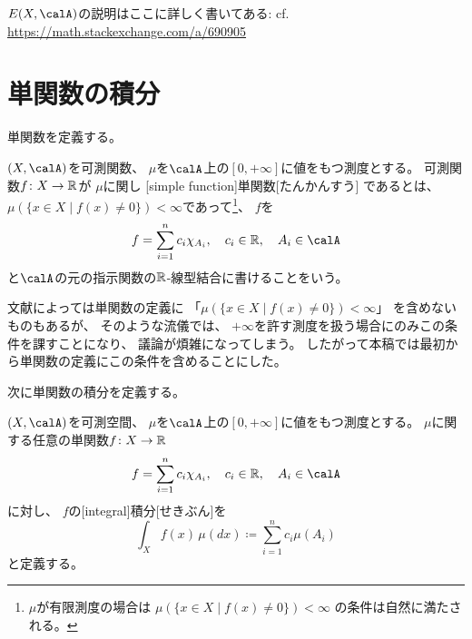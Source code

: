 \documentclass[report]{jlreq}
\begin{document}
\begin{example}[可測な確率変数]
    $E(X, \calA)$の説明はここに詳しく書いてある:
    cf. \url{https://math.stackexchange.com/a/690905}
\end{example}

%
\section{単関数の積分}

単関数を定義する。

\begin{definition}[単関数]
    $(X, \calA)$を可測関数、
    $\mu$を$\calA$上の$[0, +\infty]$に値をもつ測度とする。
    可測関数$f \colon X \to \mathbb{R}$が
    $\mu$に関し
    [simple function]{単関数}[たんかんすう]
    であるとは、
    $\mu(\{ x \in X \mid f(x) \neq 0 \}) < \infty$であって\footnote{
        $\mu$が有限測度の場合は
        $\mu(\{ x \in X \mid f(x) \neq 0 \}) < \infty$
        の条件は自然に満たされる。
    }、
    $f$を
    \begin{equation}
        f = \sum_{i = 1}^n c_i \chi_{A_i},
            \quad
            c_i \in \R,
            \quad
            A_i \in \calA
    \end{equation}
    と$\calA$の元の指示関数の$\mathbb{R}$-線型結合に書けることをいう。
\end{definition}

文献によっては単関数の定義に
「$\mu(\{ x \in X \mid f(x) \neq 0 \}) < \infty$」
を含めないものもあるが、
そのような流儀では、
$+\infty$を許す測度を扱う場合にのみこの条件を課すことになり、
議論が煩雑になってしまう。
したがって本稿では最初から単関数の定義にこの条件を含めることにした。

次に単関数の積分を定義する。

\begin{definition}[単関数の積分]
    $(X, \calA)$を可測空間、
    $\mu$を$\calA$上の$[0, +\infty]$に値をもつ測度とする。
    $\mu$に関する任意の単関数$f \colon X \to \mathbb{R}$
    \begin{equation}
        f = \sum_{i = 1}^n c_i \chi_{A_i},
            \quad
            c_i \in \R,
            \quad
            A_i \in \calA
    \end{equation}
    に対し、
    $f$の[integral]{積分}[せきぶん]を
    \begin{equation}
        \int_X f(x) \, \mu(dx)
            \coloneqq \sum_{i = 1}^n c_i \mu(A_i)
    \end{equation}
    と定義する。
\end{definition}
\end{document}
